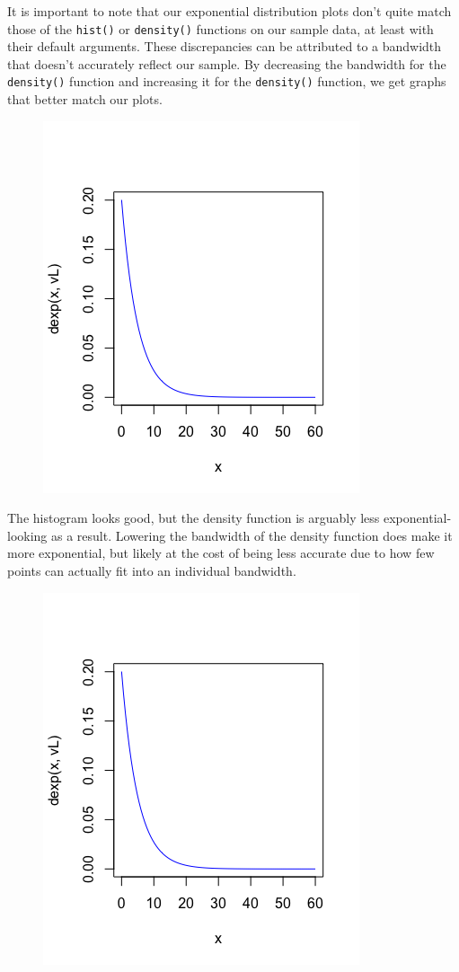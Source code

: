 \documentclass[12pt, a4paper, oneside]{report}
\begin{document}
It is important to note that our exponential distribution plots don't quite match those of the \lstinline{hist()} or \lstinline{density()} functions on our sample data, at least with their default arguments. These discrepancies can be attributed to a bandwidth that doesn't accurately reflect our sample. 
By decreasing the bandwidth for the \lstinline{density()} function and increasing it for the \lstinline{density()} function, we get graphs that better match our plots.

\begin{figure}[h]
  \centering
  \includegraphics[scale=0.5]{images/vL.png}
  \caption{}
\end{figure}

The histogram looks good, but the density function is arguably less exponential-looking as a result. Lowering the bandwidth of the density function does make it more exponential, but likely at the cost of being less accurate due to how few points can actually fit into an individual bandwidth. 

\begin{figure}[h]
  \centering
  \includegraphics[scale=0.5]{images/vL.png}
  \caption{}
\end{figure}
\end{document}
